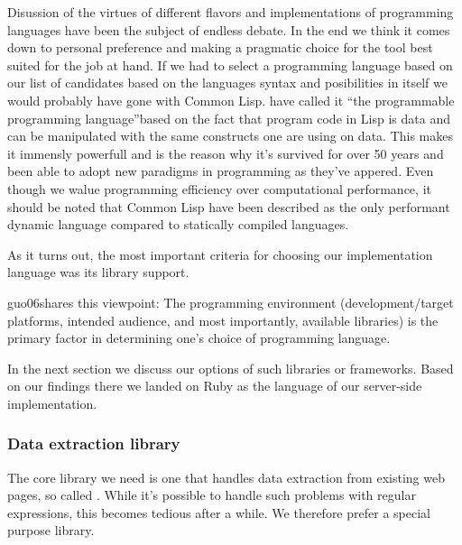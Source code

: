 Disussion of the virtues of different flavors and implementations of
programming languages have been the subject of endless debate.
In the end we think it comes down to
personal preference and making a pragmatic choice for the tool best suited for
the job at hand. If we had to select a programming language based on our list
of candidates based on the languages syntax and posibilities in itself we
would probably have gone with Common Lisp. \citet[]{foderaro91} have
called it ``the programmable programming language''based on the fact that
program code in Lisp is data and can be manipulated with the same constructs
one are using on data. This makes it immensly powerfull and is the reason why
it's survived for over 50 years \citep[]{mccarthy78}
and been able to adopt new paradigms in programming as they've appered.
Even though we walue programming efficiency over computational performance,
it should be noted that Common Lisp have been described as the only performant
dynamic language \citep{martin08} compared to statically compiled languages.%

As it turns out, the most important criteria for choosing our implementation
language was its library support.

\begin{fullquote}{guo06}{shares this viewpoint:}
  The programming environment (development/target platforms, intended
  audience, and most importantly, available libraries) is the primary factor
  in determining one's choice of programming language.
\end{fullquote}

In the next section we discuss our options
of such libraries or frameworks. Based on our findings there we landed on
Ruby as the language of our server-side implementation.

\subsubsection{Data extraction library}

The core library we need is one that handles data extraction from existing
web pages, so called  . While it's possible to
handle such problems with regular expressions, this becomes tedious after a
while. We therefore prefer a special purpose library.

